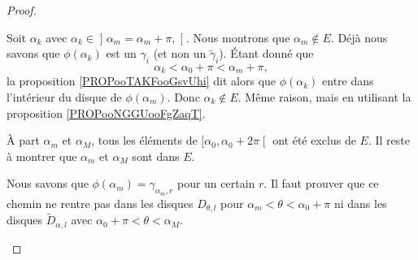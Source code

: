 \begin{proof}
\begin{subproof}
			\spitem[\( \mathopen\rbrack \alpha_m,\alpha_m+\pi\mathclose\lbrack\cap E=\emptyset\)]
			Soit \( \alpha_k\) avec \( \alpha_k\in\mathopen] \alpha_m=\alpha_m+\pi,\mathclose[\). Nous montrons que \( \alpha_m\not\in E\). Déjà nous savons que \( \phi(\alpha_k)\) est un \( \gamma_i\) (et non un \( \tilde \gamma_i\)). Étant donné que
		\begin{equation}
			\alpha_k<\alpha_0+\pi<\alpha_m+\pi,
		\end{equation}
		la proposition \ref{PROPooTAKFooGsvUhi} dit alors que \( \phi(\alpha_k)\) entre dans l'intérieur du disque de \( \phi(\alpha_m)\). Donc \( \alpha_k\not\in E\).
		\spitem[\( \mathopen\rbrack \alpha_0+\pi,\phi_M\lbrack\cap E=\emptyset\)]
		Même raison, mais en utilisant la proposition \ref{PROPooNGGUooFgZaqT}.

		\spitem[Ce qu'il reste de \( E\)]
		À part \( \alpha_m\) et \( \alpha_M\), tous les éléments de \( \mathopen[ \alpha_0,\alpha_0+2\pi\mathclose[\) ont été exclus de \( E\). Il reste à montrer que \( \alpha_m\) et \( \alpha_M\) sont dans \( E\).

		\spitem[\( \alpha_m\in E\)]
		Nous savons que \( \phi(\alpha_m)=\gamma_{\alpha_m,r}\) pour un certain \( r\). Il faut prouver que ce chemin ne rentre pas dans les disques \( D_{\theta,l}\) pour \( \alpha_m<\theta<\alpha_0+\pi\) ni dans les disques \( \tilde D_{\alpha,l}\) avec \( \alpha_0+\pi<\theta<\alpha_M\).


\end{subproof}
\end{proof}

